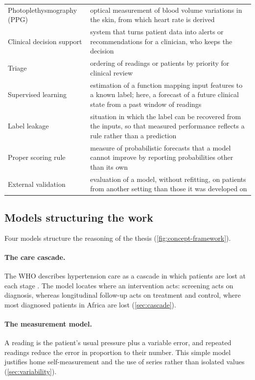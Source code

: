 \begin{table}[htbp]
\begin{tabularx}{\textwidth}{@{}>{\raggedright\arraybackslash}p{3.3cm} X@{}}
Photoplethysmography (PPG) & optical measurement of blood volume variations in the skin, from which heart rate is derived \\
Clinical decision support & system that turns patient data into alerts or recommendations for a clinician, who keeps the decision \\
Triage & ordering of readings or patients by priority for clinical review \\
Supervised learning & estimation of a function mapping input features to a known label; here, a forecast of a future clinical state from a past window of readings \\
Label leakage & situation in which the label can be recovered from the inputs, so that measured performance reflects a rule rather than a prediction \\
Proper scoring rule & measure of probabilistic forecasts that a model cannot improve by reporting probabilities other than its own \parencite{gneiting2007} \\
External validation & evaluation of a model, without refitting, on patients from another setting than those it was developed on \\
\bottomrule
\end{tabularx}
\end{table}

\subsection{Models structuring the work}\label{sec:models}

Four models structure the reasoning of the thesis (\cref{fig:concept-framework}).

\paragraph{The care cascade.} The WHO describes hypertension care as a cascade in which patients are lost at each stage \parencite{who2023hypertension}. The model locates where an intervention acts: screening acts on diagnosis, whereas longitudinal follow-up acts on treatment and control, where most diagnosed patients in Africa are lost (\cref{sec:cascade}).

\paragraph{The measurement model.} A reading is the patient's usual pressure plus a variable error, and repeated readings reduce the error in proportion to their number. This simple model justifies home self-measurement and the use of series rather than isolated values (\cref{sec:variability}).

